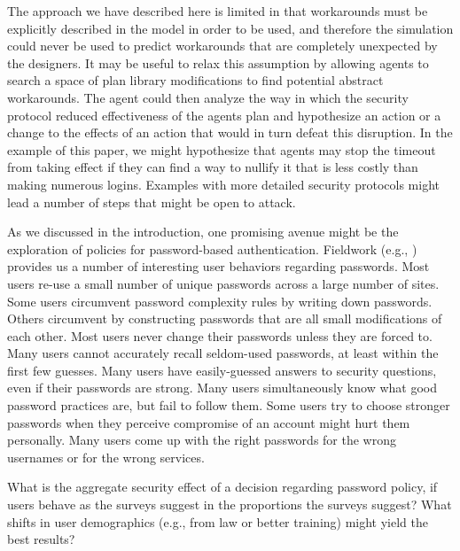 \documentclass{acm_proc_article-sp}
\begin{document}
The approach we have described here is limited in that workarounds
must be explicitly described in the model in order to be used, and
therefore the simulation could never be used to predict workarounds
that are completely unexpected by the designers. It may be useful to
relax this assumption by allowing agents to search a space of plan
library modifications to find potential abstract workarounds. The
agent could then analyze the way in which the security protocol
reduced effectiveness of the agents plan and hypothesize an action or
a change to the effects of an action that would in turn defeat this
disruption. In the example of this paper, we might hypothesize that
agents may stop the timeout from taking effect if they can find a way
to nullify it that is less costly than making numerous
logins. Examples with more detailed security protocols might lead a
number of steps that might be open to attack.

As we discussed in the introduction, one promising avenue might be the
exploration of policies for password-based authentication. Fieldwork
(e.g., \cite{BS03, riley2006password, DP00, schechter2009s,
  schechter2007emperor, florencio2007large, gaw2006password}) provides
us a number of interesting user behaviors regarding passwords.  Most
users re-use a small number of unique passwords across a large number
of sites.  Some users circumvent password complexity rules by writing
down passwords.  Others circumvent by constructing passwords that are
all small modifications of each other.  Most users never change their
passwords unless they are forced to.  Many users cannot accurately
recall seldom-used passwords, at least within the first few guesses.
Many users have easily-guessed answers to security questions, even if
their passwords are strong.  Many users simultaneously know what good
password practices are, but fail to follow them.  Some users try to
choose stronger passwords when they perceive compromise of an account
might hurt them personally. Many users come up with 
the right passwords for the wrong usernames or for the wrong services.

What is the aggregate security effect of a decision regarding password
policy, if users behave as the surveys suggest in the proportions the
surveys suggest?  What shifts in user demographics (e.g., from law or
better training) might yield the best results?
\end{document}
